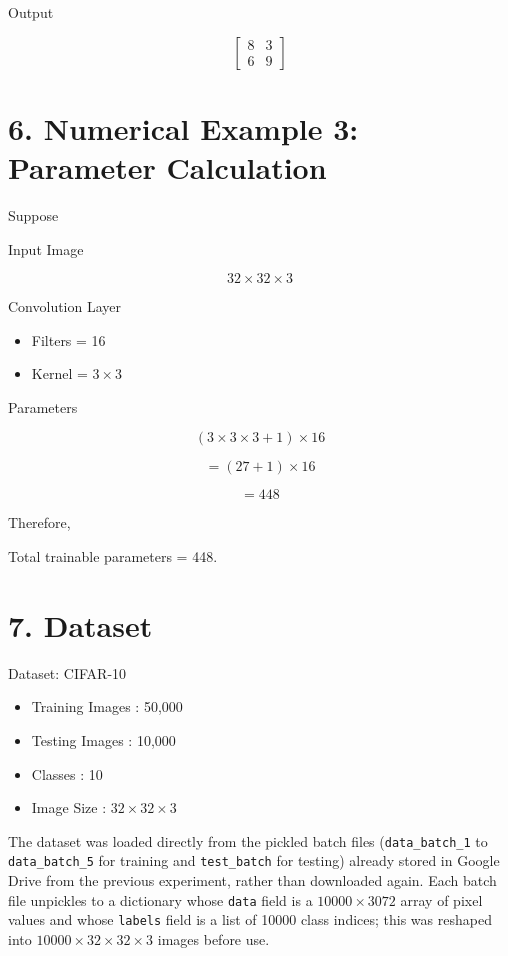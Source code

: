 \documentclass[11pt]{article}
\begin{document}
Output

\[
\begin{bmatrix}
8&3\\
6&9
\end{bmatrix}
\]


\section*{6. Numerical Example 3: Parameter Calculation}

Suppose

Input Image

\[
32\times32\times3
\]

Convolution Layer

\begin{itemize}
\item Filters = 16
\item Kernel = $3\times3$
\end{itemize}

Parameters

\[
(3\times3\times3+1)\times16
\]

\[
=(27+1)\times16
\]

\[
=448
\]

Therefore,

Total trainable parameters = 448.


\section*{7. Dataset}

Dataset: CIFAR-10

\begin{itemize}
\item Training Images : 50,000
\item Testing Images : 10,000
\item Classes : 10
\item Image Size : $32\times32\times3$
\end{itemize}

The dataset was loaded directly from the pickled batch files
(\texttt{data\_batch\_1} to \texttt{data\_batch\_5} for training and
\texttt{test\_batch} for testing) already stored in Google Drive from the
previous experiment, rather than downloaded again. Each batch file
unpickles to a dictionary whose \texttt{data} field is a
$10000 \times 3072$ array of pixel values and whose \texttt{labels}
field is a list of 10000 class indices; this was reshaped into
$10000 \times 32 \times 32 \times 3$ images before use.
\end{document}
